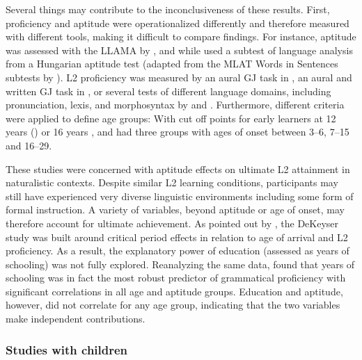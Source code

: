 \documentclass[output=paper]{langscibook}
\begin{document}
\begin{sloppypar}
Several things may contribute to the inconclusiveness of these results. First, proficiency and aptitude were operationalized differently and therefore measured with different tools, making it difficult to compare findings. For instance, aptitude was assessed with the LLAMA \citep{MearaEtAl2001} by \citet{AbrahamssonHyltenstam2008}, and \citet{GranenaLong2012} while \citet{DeKeyser2000} used a subtest of language analysis from a Hungarian aptitude test (adapted from the MLAT Words in Sentences subtests by \citealt{Otto1996}). L2 proficiency was measured by an aural GJ task in \citet{DeKeyser2000}, an aural and written GJ task in \citet{AbrahamssonHyltenstam2008}, or several tests of different language domains, including pronunciation, lexis, and morphosyntax by \citet{GranenaLong2012} and \citet{Granena2012}. Furthermore, different criteria were applied to define age groups: With cut off points for early learners at 12 years (\citealt{AbrahamssonHyltenstam2008}) or 16 years \citep{DeKeyser2000}, \citet{GranenaLong2012} and \citet{Granena2012} had three groups with ages of onset between 3--6, 7--15 and 16--29. 
\end{sloppypar}

These studies were concerned with aptitude effects on ultimate L2 attainment in naturalistic contexts. Despite similar L2 learning conditions, participants may still have experienced very diverse linguistic environments including some form of formal instruction. A variety of variables, beyond aptitude or age of onset, may therefore account for ultimate achievement. As pointed out by \citet{Birdsong2014}, the DeKeyser study was built around critical period effects in relation to age of arrival and L2 proficiency. As a result, the explanatory power of education (assessed as years of schooling) was not fully explored. Reanalyzing the same data, \citet{Birdsong2014} found that years of schooling was in fact the most robust predictor of grammatical proficiency with significant correlations in all age and aptitude groups. Education and aptitude, however, did not correlate for any age group, indicating that the two variables make independent contributions.

\subsubsection{Studies with children}\label{sec:01:2.2.2} %
\end{document}
